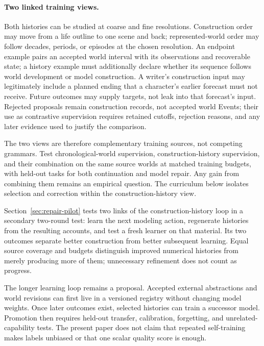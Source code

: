 \documentclass[10pt]{article}
\begin{document}
\paragraph{Two linked training views.}
Both histories can be studied at coarse and fine resolutions. Construction
order may move from a life outline to one scene and back; represented-world
order may follow decades, periods, or episodes at the chosen resolution.
An endpoint example pairs an accepted
world interval with its observations and recoverable state; a history example
must additionally declare whether its sequence follows world development or
model construction. A writer's construction input may legitimately include
a planned ending that a character's earlier forecast must not receive.
Future outcomes may supply targets, not leak into that forecast's input.
Rejected proposals remain construction records, not accepted world Events;
their use as contrastive supervision requires retained cutoffs, rejection
reasons, and any later evidence used to justify the comparison.

The two views are therefore complementary training sources, not competing
grammars. Test chronological-world supervision, construction-history
supervision, and their combination on the same source worlds at matched
training budgets, with held-out tasks for both continuation and model repair.
Any gain from combining them remains an empirical question. The curriculum
below isolates selection and correction within the construction-history view.

Section~\ref{sec:repair-pilot} tests two links of the construction-history loop
in a secondary two-round test:
learn the next modeling action, regenerate histories from the resulting
accounts, and test a fresh learner on that material. Its two outcomes separate
better construction from better subsequent learning. Equal source coverage and
budgets distinguish improved numerical histories from merely producing more
of them; unnecessary refinement does not count as progress.

The longer learning loop remains a proposal. Accepted external abstractions and
world revisions can first live in a versioned registry without changing model
weights. Once later outcomes exist, selected histories can train a successor
model. Promotion then requires held-out transfer, calibration, forgetting, and
unrelated-capability tests. The present paper does not claim that repeated
self-training makes labels unbiased or that one scalar quality score is enough.
\end{document}
